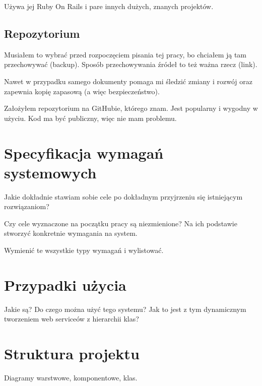 Używa jej Ruby On Rails i pare innych dużych, znanych projektów.

\subsection{Repozytorium}
Musiałem to wybrać przed rozpoczęciem pisania tej pracy, bo chciałem ją tam przechowywać (backup). Sposób przechowywania źródeł to też ważna rzecz (link).

Nawet w przypadku samego dokumenty pomaga mi śledzić zmiany i rozwój oraz zapewnia kopię zapasową (a więc bezpieczeństwo).

Założyłem repozytorium na GitHubie, którego znam. Jest popularny i wygodny w użyciu. Kod ma być publiczny, więc nie mam problemu. 



\section{Specyfikacja wymagań systemowych}
Jakie dokładnie stawiam sobie cele po dokładnym przyjrzeniu się istniejącym rozwiązaniom?

Czy cele wyznaczone na początku pracy są niezmienione? Na ich podstawie stworzyć konkretnie wymagania na system.

Wymienić te wszystkie typy wymagań i wylistować.




\section{Przypadki użycia}
Jakie są? Do czego można użyć tego systemu? Jak to jest z tym dynamicznym tworzeniem web serviceów z hierarchii klas?



\section{Struktura projektu}
Diagramy warstwowe, komponentowe, klas.

